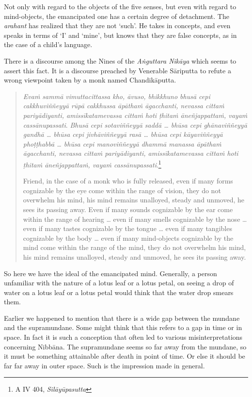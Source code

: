 Not only with regard to the objects of the five senses, but even with regard to mind-objects, the emancipated one has a certain degree of detachment. The \emph{arahant} has realized that they are not `such'. He takes in concepts, and even speaks in terms of `I' and `mine', but knows that they are false concepts, as in the case of a child's language.

There is a discourse among the Nines of the \emph{Aṅguttara Nikāya} which seems to assert this fact. It is a discourse preached by Venerable Sāriputta to refute a wrong viewpoint taken by a monk named Chandikāputta.

\begin{quote}
\emph{Evaṁ sammā vimuttacittassa kho, āvuso, bhikkhuno bhusā cepi cakkhuviññeyyā rūpā cakkhussa āpāthaṁ āgacchanti, nevassa cittaṁ pariyādiyanti, amissīkatamevassa cittaṁ hoti ṭhitaṁ āneñjappattaṁ, vayaṁ cassānupassati}. \emph{Bhusā cepi sotaviññeyyā saddā \ldots{} bhūsa cepi ghānaviññeyyā gandhā \ldots{} bhūsa cepi jivhāviññeyyā rasā \ldots{} bhūsa cepi kāyaviññeyyā phoṭṭhabbā \ldots{} bhūsa cepi manoviññeyyā dhammā manassa āpāthaṁ āgacchanti, nevassa cittaṁ pariyādiyanti, amissīkatamevassa cittaṁ hoti ṭhitaṁ āneñjappattaṁ, vayaṁ cassānupassati}.\footnote{A IV 404, \emph{Silāyūpasutta}}

Friend, in the case of a monk who is fully released, even if many forms cognizable by the eye come within the range of vision, they do not overwhelm his mind, his mind remains unalloyed, steady and unmoved, he sees its passing away. Even if many sounds cognizable by the ear come within the range of hearing \ldots{} even if many smells cognizable by the nose \ldots{} even if many tastes cognizable by the tongue \ldots{} even if many tangibles cognizable by the body \ldots{} even if many mind-objects cognizable by the mind come within the range of the mind, they do not overwhelm his mind, his mind remains unalloyed, steady and unmoved, he sees its passing away.
\end{quote}

So here we have the ideal of the emancipated mind. Generally, a person unfamiliar with the nature of a lotus leaf or a lotus petal, on seeing a drop of water on a lotus leaf or a lotus petal would think that the water drop smears them.

Earlier we happened to mention that there is a wide gap between the mundane and the supramundane. Some might think that this refers to a gap in time or in space. In fact it is such a conception that often led to various misinterpretations concerning Nibbāna. The supramundane seems so far away from the mundane, so it must be something attainable after death in point of time. Or else it should be far far away in outer space. Such is the impression made in general.

